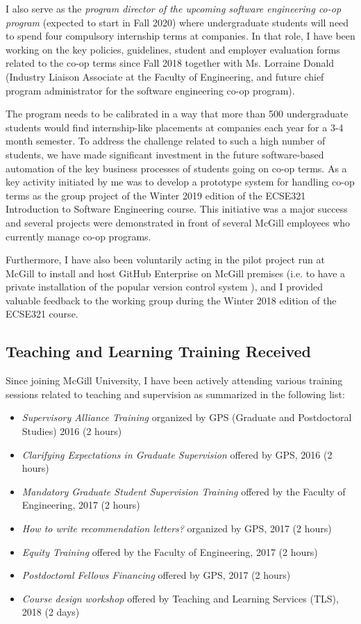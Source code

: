 \documentclass[a4paper,11pt]{report}
\begin{document}
I also serve as the \emph{program director of the upcoming software engineering co-op program} (expected to start in 
Fall 2020) where undergraduate students will need to spend four compulsory internship terms at companies. In that role, I 
have been working on the key policies, guidelines, student and employer evaluation forms related to the co-op terms since 
Fall 2018 together with Ms. Lorraine Donald (Industry Liaison Associate at the Faculty of Engineering, and future chief 
program administrator for the software engineering co-op program). 

The program needs to be calibrated in a way that more than 500 undergraduate students would find internship-like 
placements at companies each year for a 3-4 month semester. To address the challenge related to such a high number of 
students, we have made significant investment in the future software-based automation of the key business processes of 
students going on co-op terms. As a key activity initiated by me was to develop a prototype system for handling co-op terms 
as the group project of the Winter 2019 edition of the ECSE321 Introduction to Software Engineering course. This initiative 
was a major success and several projects were demonstrated in front of several McGill employees who currently manage 
co-op programs. 

Furthermore, I have also been voluntarily acting in the pilot project run at McGill to install and host GitHub Enterprise on McGill premises (i.e. to have a private installation of the popular version control system ), and I provided valuable feedback to the working group during the Winter 2018 edition of the ECSE321 course.

\subsection{Teaching and Learning Training Received}
Since joining McGill University, I have been actively attending various training sessions related to teaching and supervision as summarized in the following list:

\begin{itemize}
\item \emph{Supervisory Alliance Training} organized by GPS (Graduate and Postdoctoral Studies)  2016 (2 hours)
\item \emph{Clarifying Expectations in Graduate Supervision} offered by GPS,  2016 (2 hours)
\item \emph{Mandatory Graduate Student Supervision Training} offered by the Faculty of Engineering,  2017 (2 hours)
\item \emph{How to write recommendation letters?} organized by GPS, 2017 (2 hours)
\item \emph{Equity Training} offered by the Faculty of Engineering, 2017 (2 hours)
\item \emph{Postdoctoral Fellows Financing} offered by GPS, 2017 (2 hours)
\item \emph{Course design workshop} offered by Teaching and Learning Services (TLS), 2018 (2 days)
\end{itemize}
\end{document}
